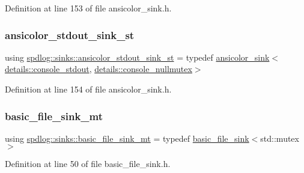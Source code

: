 Definition at line 153 of file ansicolor\+\_\+sink.\+h.

\mbox{\label{namespacespdlog_1_1sinks_aa30d2f8d27e36f73043723a42199fd7b}} 
\subsubsection{\texorpdfstring{ansicolor\+\_\+stdout\+\_\+sink\+\_\+st}{ansicolor\_stdout\_sink\_st}}
{\footnotesize\ttfamily using \hyperlink{namespacespdlog_1_1sinks_aa30d2f8d27e36f73043723a42199fd7b}{spdlog\+::sinks\+::ansicolor\+\_\+stdout\+\_\+sink\+\_\+st} = typedef \hyperlink{classspdlog_1_1sinks_1_1ansicolor__sink}{ansicolor\+\_\+sink}$<$\hyperlink{structspdlog_1_1details_1_1console__stdout}{details\+::console\+\_\+stdout}, \hyperlink{structspdlog_1_1details_1_1console__nullmutex}{details\+::console\+\_\+nullmutex}$>$}



Definition at line 154 of file ansicolor\+\_\+sink.\+h.

\mbox{\label{namespacespdlog_1_1sinks_a3c2170781ef0f706f8cea55f8d6b0609}} 
\subsubsection{\texorpdfstring{basic\+\_\+file\+\_\+sink\+\_\+mt}{basic\_file\_sink\_mt}}
{\footnotesize\ttfamily using \hyperlink{namespacespdlog_1_1sinks_a3c2170781ef0f706f8cea55f8d6b0609}{spdlog\+::sinks\+::basic\+\_\+file\+\_\+sink\+\_\+mt} = typedef \hyperlink{classspdlog_1_1sinks_1_1basic__file__sink}{basic\+\_\+file\+\_\+sink}$<$std\+::mutex$>$}



Definition at line 50 of file basic\+\_\+file\+\_\+sink.\+h.

\mbox{\label{namespacespdlog_1_1sinks_ab6d38313481cd7fedfb8aeb68c2c61d1}} 
